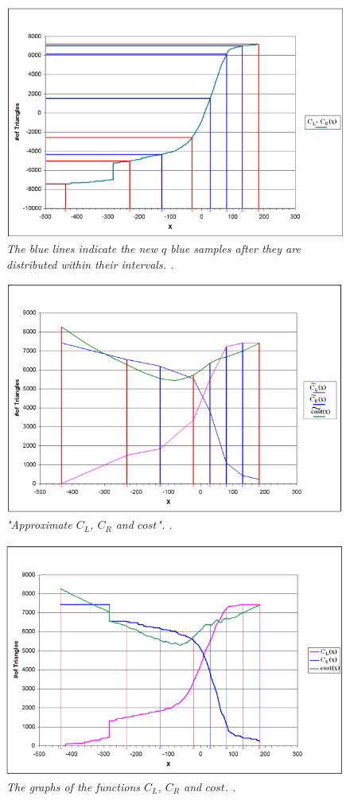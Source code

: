 \documentclass[12pt]{article}
\begin{document}
\begin{figure}
\centering
\includegraphics[width=12cm]{figs/sampling2}
\caption{\textit{The blue lines indicate the new $q$ blue samples after they are distributed within their intervals. \cite[Figure 4]{hunt2006fast}. }}
\label{figure:samp2}
\end{figure}
\begin{figure}
\centering
\includegraphics[width=12cm]{figs/approximateCost}
\caption{\textit{"Approximate $C_L$, $C_R$ and $cost$". \cite[Figure 5]{hunt2006fast}.}}
\label{figure:ac}
\end{figure}
\begin{figure}
\centering
\includegraphics[width=12cm]{figs/trueCost}
\caption{\textit{The graphs of the functions $C_L$, $C_R$ and $cost$. \cite[Figure 6]{hunt2006fast}.}}
\label{figure:tc}
\end{figure}
\end{document}
